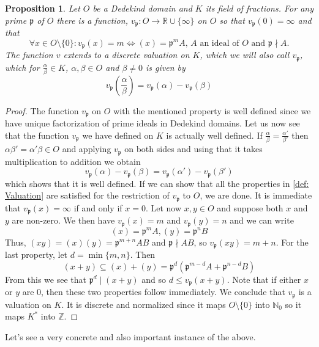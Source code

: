 \documentclass{article}
\newtheorem{proposition}{Proposition}[section]
\newcommand{\mfrak}[1]{\mathfrak{#1}}
\newcommand{\mbb}[1]{\mathbb{#1}}
\newcommand{\vp}{{v_{\mfrak p}}}
\numberwithin{equation}{section}
\begin{document}
\begin{proposition} \label{prop: Valuations on Dedekind domains}
	Let $O$ be a Dedekind domain and $K$ its field of fractions. For any prime $\mfrak p$ of $O$ there is a function, $\vp : O \to \mbb R \cup \{\infty \}$ on $O$ so that $\vp(0) = \infty$ and that
	\begin{equation}\label{eq: valuation}
    	\forall x \in O\setminus \{0 \}: \vp(x) = m \iff (x) = \mfrak p^m A \text{, $A$ an ideal of $O$ and $\mfrak p \nmid A$}.
	\end{equation}
	The function $v$ extends to a discrete valuation on $K$, which we will also call $\vp$, which for $\frac{\alpha}{\beta} \in K$, $\alpha,\beta \in O$ and $\beta \neq 0$ is given by %
	$$v_\mfrak{p}(\frac{\alpha}{\beta}) = v_\mfrak{p}(\alpha) - v_\mfrak{p}(\beta)$$
\end{proposition}

\begin{proof}
	The function $\vp$ on $O$ with the mentioned property is well defined since we have unique factorization of prime ideals in Dedekind domains. Let us now see that the function $\vp$ we have defined on $K$ is actually well defined. If $\frac{\alpha}{\beta} = \frac{\alpha'}{\beta'}$ then $\alpha\beta' = \alpha'\beta \in O$ and applying $\vp$ on both sides and using that it takes multiplication to addition we obtain
	$$\vp(\alpha) - \vp(\beta) = \vp(\alpha') - \vp(\beta')$$
	which shows that it is well defined. If we can show that all the properties in \cref{def: Valuation} are satisfied for the restriction of $\vp$ to $O$, we are done. It is immediate that $\vp(x) = \infty$ if and only if $x = 0$. Let now $x,y \in O$ and suppose both $x$ and $y$ are non-zero. We then have $\vp (x) = m$ and $\vp (y) = n$ and we can write
	$$(x) = \mfrak{p}^m A, (y) = \mfrak{p}^n B$$
	Thus, $(xy) = (x)(y) = \mfrak{p}^{m+n} AB$ and $\mfrak p \nmid AB$, so $\vp(xy) = m + n$. For the last property, let $d = \min\{m, n\}$. Then
	$$(x + y) \subseteq (x) + (y) = \mfrak p^d (\mfrak p^{m-d} A + \mfrak p^{n-d} B)$$
	From this we see that $\mfrak p^d \mid (x + y)$ and so $d \leq \vp (x+y)$.
	Note that if either $x$ or $y$ are 0, then these two properties follow immediately. We conclude that $\vp$ is a valuation on $K$. It is discrete and normalized since it maps $O \setminus \{0 \}$ into $\mbb N_0$ so it maps $K^*$ into $\mbb Z$.
\end{proof}

Let's see a very concrete and also important instance of the above.
\end{document}
